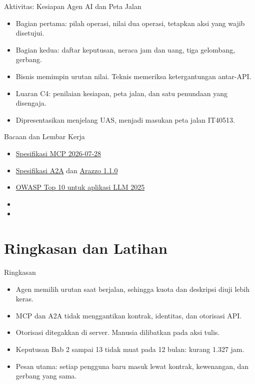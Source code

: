 \documentclass[aspectratio=169, table, 12pt]{beamer}
\begin{document}
\begin{frame}{{\Large Aktivitas: Kesiapan Agen AI dan Peta Jalan}}
  \vspace{4pt}
  \begin{itemize}
    \item Bagian pertama: pilah operasi, nilai dua operasi, tetapkan aksi yang wajib disetujui.
    \item Bagian kedua: daftar keputusan, neraca jam dan uang, tiga gelombang, gerbang.
    \item Bisnis memimpin urutan nilai. Teknis memeriksa ketergantungan antar-API.
    \item Luaran C4: penilaian kesiapan, peta jalan, dan satu penundaan yang disengaja.
    \item Dipresentasikan menjelang UAS, menjadi masukan peta jalan IT40513.
  \end{itemize}
\end{frame}

\begin{frame}{{\Large Bacaan dan Lembar Kerja}}
  \vspace{8pt}
  \begin{itemize}
    \item \href{https://modelcontextprotocol.io/specification/2026-07-28}{Spesifikasi MCP 2026-07-28}
    \item \href{https://a2a-protocol.org/latest/specification/}{Spesifikasi A2A} dan \href{https://spec.openapis.org/arazzo/v1.1.0.html}{Arazzo 1.1.0}
    \item \href{https://genai.owasp.org/llm-top-10/}{OWASP Top 10 untuk aplikasi LLM 2025}
    \item {}
    \item {}
  \end{itemize}
\end{frame}

\section{Ringkasan dan Latihan}

\begin{frame}{{\Large Ringkasan}}
  \vspace{6pt}
  \begin{itemize}
    \item Agen memilih urutan saat berjalan, sehingga kuota dan deskripsi diuji lebih keras.
    \item MCP dan A2A tidak menggantikan kontrak, identitas, dan otorisasi API.
    \item Otorisasi ditegakkan di server. Manusia dilibatkan pada aksi tulis.
    \item Keputusan Bab 2 sampai 13 tidak muat pada 12 bulan: kurang 1.327 jam.
    \item Pesan utama: setiap pengguna baru masuk lewat kontrak, kewenangan, dan gerbang yang sama.
  \end{itemize}
\end{frame}
\end{document}
